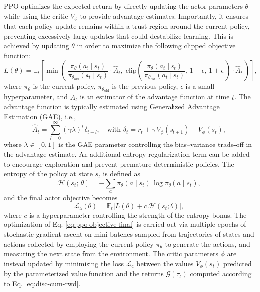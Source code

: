 PPO optimizes the expected return by directly updating the actor parameters $\theta$ while using the critic $V_{\phi}$ to provide advantage estimates. Importantly, it ensures that each policy update remains within a trust region around the current policy, preventing excessively large updates that could destabilize learning. This is achieved by updating $\theta$ in order to maximize the following clipped objective function:
\begin{equation}
\label{eq:ppo-objective}
    L(\theta) = \mathbb{E}_{t} \left[ \min \left( \, \dfrac{\pi_{\theta}(a_t \mid s_t)}{\pi_{\theta_{\text{old}}}(a_t \mid s_t)} \cdot \hat{A}_{t}, \; \text{clip}\left( \, \dfrac{\pi_{\theta}(a_t \mid s_t)}{\pi_{\theta_{\text{old}}}(a_t \mid s_t)}, \, 1 - \epsilon, \, 1 + \epsilon \, \right) \cdot \hat{A}_{t} \,\right) \right], 
\end{equation}
where $\pi_{\theta}$ is the current policy, $\pi_{\theta_{\text{old}}}$ is the previous policy, $\epsilon$ is a small hyperparameter, and $\hat{A}_t$ is an estimator of the advantage function at time $t$. The advantage function is typically estimated using Generalized Advantage Estimation (GAE), i.e.,
\begin{equation}
\label{eq:gae}
    \hat{A}_t = \sum_{l=0}^{\infty} (\gamma \lambda)^l \, \delta_{t+l}, \quad \text{with } \delta_t = r_t + \gamma \, V_{\phi}(s_{t+1}) - V_{\phi}(s_t),
\end{equation}
where $\lambda \in [0,1]$ is the GAE parameter \cite{ppo} controlling the bias–variance trade-off in the advantage estimate. An additional entropy regularization term can be added to encourage exploration and prevent premature deterministic policies. The entropy of the policy at state $s_t$ is defined as
\begin{equation}
    \mathcal{H}(s_t; \,  \theta) = - \sum_{a} \pi_\theta(a \mid s_t) \, \log \pi_\theta(a \mid s_t),
\end{equation}
and the final actor objective becomes
\begin{equation}
    \mathcal{L}_{\text{a}}(\theta) = \mathbb{E}_{t} \Big[ L(\theta) + c \, \mathcal{H}(s_t; \theta) \Big],
    \label{eq:ppo-objective-final}
\end{equation}
where $c$ is a hyperparameter controlling the strength of the entropy bonus. The optimization of Eq. \ref{eq:ppo-objective-final} is carried out via  multiple epochs of stochastic gradient ascent on mini-batches sampled from trajectories of states and actions collected by employing the current policy $\pi_{\theta}$ to generate the actions, and measuring the next state from the environment.
The critic parameters $\phi$ are instead updated by minimizing the loss $\mathcal{L}_{\text{c}}$ between the values $V_{\phi}(s_t)$ predicted by the parameterized value function and the returns $\mathcal{G}(\tau_t)$ computed according to Eq. \ref{eq:disc-cum-rwd}.

